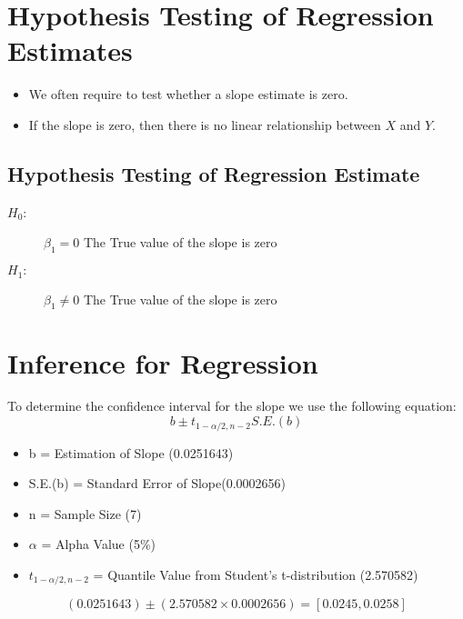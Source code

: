 \documentclass[]{report}
\begin{document}
	
	\section{Hypothesis Testing of Regression Estimates}

	\begin{itemize}
		\item We often require to test whether a slope estimate is zero.
		\item If the slope is zero, then there is no linear relationship between $X$ and $Y$.
	\end{itemize}
	

	
	
	\subsection{Hypothesis Testing of Regression Estimate}
	
	\begin{description}
		\item[$H_0$:] $\beta_1 = 0$  The True value of the slope is zero
		\item[$H_1:$] $\beta_1 \neq 0$ The True value of the slope is zero
	\end{description}

	\section{Inference for Regression}
	To determine the confidence interval for the slope we use the
	following equation:
	\begin{equation}
	b \pm t_{1-\alpha/2,n-2} S.E.(b)
	\end{equation}
	
	\begin{itemize}
		\item b = Estimation of Slope (0.0251643) \item S.E.(b) = Standard
		Error of Slope(0.0002656) \item n = Sample Size (7) \item $\alpha$
		= Alpha Value (5\%) \item $t_{1-\alpha/2,n-2}$ = Quantile Value
		from Student’s t-distribution (2.570582)
	\end{itemize}
	
	\begin{equation}
	(0.0251643) \pm ( 2.570582 \times 0.0002656) = [ 0.0245,0.0258 ]
	\end{equation}
\end{document}
